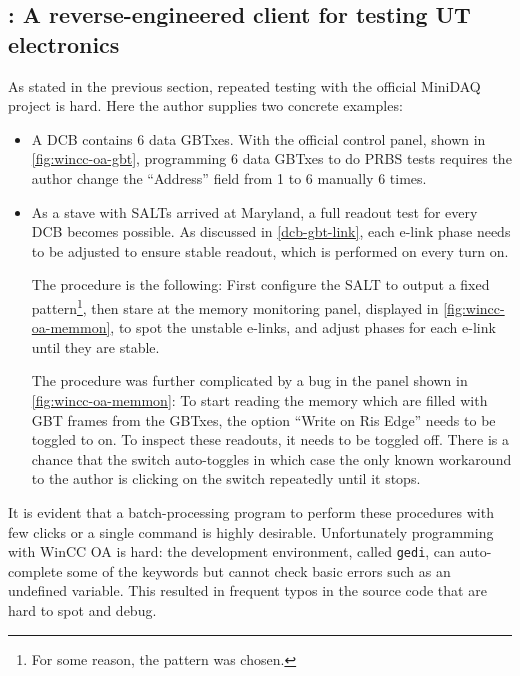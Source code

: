\subsection{\nanoDAQ: A reverse-engineered \dim client for testing UT electronics}
\label{online-nanodaq}

As stated in the previous section, repeated testing with the official MiniDAQ
project is hard.
Here the author supplies two concrete examples:

\begin{itemize}
    \item A DCB contains 6 data GBTxes.
        With the official control panel, shown in \cref{fig:wincc-oa-gbt},
        programming 6 data GBTxes to do PRBS tests requires the author change
        the ``Address'' field from 1 to 6 manually 6 times.

    \item As a stave with SALTs arrived at Maryland,
        a full readout test for every DCB becomes possible.
        As discussed in \cref{dcb-gbt-link},
        each e-link phase needs to be adjusted to ensure stable readout,
        which is performed on every turn on.

        The procedure is the following: First configure the SALT to output a
        fixed pattern\footnote{
            For some reason, the pattern  was chosen.
        }, then stare at the memory monitoring panel,
        displayed in \cref{fig:wincc-oa-memmon},
        to spot the unstable e-links, and adjust phases for each e-link until
        they are stable.

        The procedure was further complicated by a bug in the panel
        shown in \cref{fig:wincc-oa-memmon}:
        To start reading the memory which are filled with GBT frames from the
        GBTxes, the option ``Write on Ris Edge'' needs to be toggled to on. To
        inspect these readouts, it needs to be toggled off. There is a chance
        that the switch auto-toggles in which case the only known workaround to
        the author is clicking on the switch repeatedly until it stops.
\end{itemize}

It is evident that a batch-processing program to perform these procedures with
few clicks or a single command is highly desirable.
Unfortunately programming with WinCC OA is hard:
the development environment, called \lstinline{gedi}, can auto-complete
some of the keywords but cannot check basic errors such as an undefined
variable.
This resulted in frequent typos in the source code that are hard to spot and
debug.

